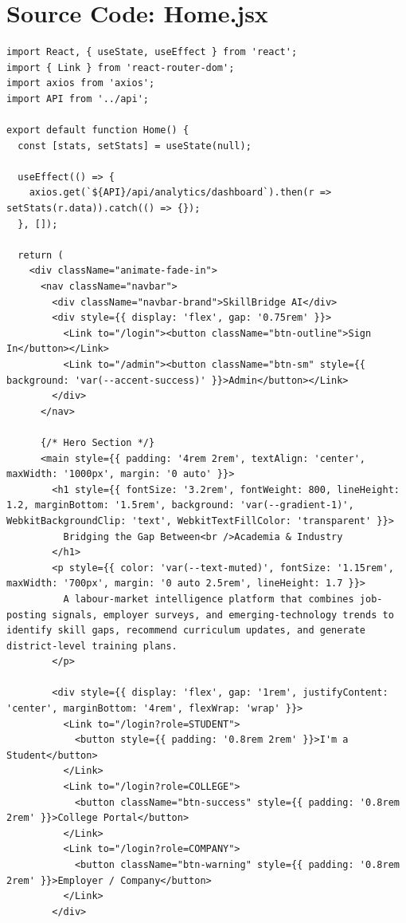 \documentclass[12pt,a4paper]{report}
\begin{document}
\section*{Source Code: Home.jsx}
\begin{verbatim}
import React, { useState, useEffect } from 'react';
import { Link } from 'react-router-dom';
import axios from 'axios';
import API from '../api';

export default function Home() {
  const [stats, setStats] = useState(null);

  useEffect(() => {
    axios.get(`${API}/api/analytics/dashboard`).then(r => setStats(r.data)).catch(() => {});
  }, []);

  return (
    <div className="animate-fade-in">
      <nav className="navbar">
        <div className="navbar-brand">SkillBridge AI</div>
        <div style={{ display: 'flex', gap: '0.75rem' }}>
          <Link to="/login"><button className="btn-outline">Sign In</button></Link>
          <Link to="/admin"><button className="btn-sm" style={{ background: 'var(--accent-success)' }}>Admin</button></Link>
        </div>
      </nav>

      {/* Hero Section */}
      <main style={{ padding: '4rem 2rem', textAlign: 'center', maxWidth: '1000px', margin: '0 auto' }}>
        <h1 style={{ fontSize: '3.2rem', fontWeight: 800, lineHeight: 1.2, marginBottom: '1.5rem', background: 'var(--gradient-1)', WebkitBackgroundClip: 'text', WebkitTextFillColor: 'transparent' }}>
          Bridging the Gap Between<br />Academia & Industry
        </h1>
        <p style={{ color: 'var(--text-muted)', fontSize: '1.15rem', maxWidth: '700px', margin: '0 auto 2.5rem', lineHeight: 1.7 }}>
          A labour-market intelligence platform that combines job-posting signals, employer surveys, and emerging-technology trends to identify skill gaps, recommend curriculum updates, and generate district-level training plans.
        </p>

        <div style={{ display: 'flex', gap: '1rem', justifyContent: 'center', marginBottom: '4rem', flexWrap: 'wrap' }}>
          <Link to="/login?role=STUDENT">
            <button style={{ padding: '0.8rem 2rem' }}>I'm a Student</button>
          </Link>
          <Link to="/login?role=COLLEGE">
            <button className="btn-success" style={{ padding: '0.8rem 2rem' }}>College Portal</button>
          </Link>
          <Link to="/login?role=COMPANY">
            <button className="btn-warning" style={{ padding: '0.8rem 2rem' }}>Employer / Company</button>
          </Link>
        </div>


\end{verbatim}
\end{document}
